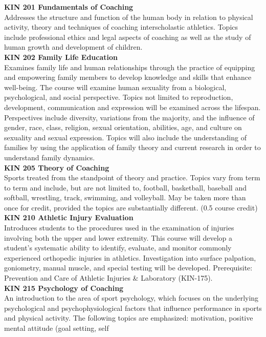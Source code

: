 \documentclass[
  letterpaper,
]{scrbook}
\begin{document}
\textbf{KIN 201 Fundamentals of Coaching}\\
Addresses the structure and function of the human body in relation to
physical activity, theory and techniques of coaching interscholastic
athletics. Topics include professional ethics and legal aspects of
coaching as well as the study of human growth and development of
children.\\
\textbf{KIN 202 Family Life Education}\\
Examines family life and human relationships through the practice of
equipping and empowering family members to develop knowledge and skills
that enhance well-being. The course will examine human sexuality from a
biological, psychological, and social perspective. Topics not limited to
reproduction, development, communication and expression will be examined
across the lifespan. Perspectives include diversity, variations from the
majority, and the influence of gender, race, class, religion, sexual
orientation, abilities, age, and culture on sexuality and sexual
expression. Topics will also include the understanding of families by
using the application of family theory and current research in order to
understand family dynamics.\\
\textbf{KIN 205 Theory of Coaching}\\
Sports treated from the standpoint of theory and practice. Topics vary
from term to term and include, but are not limited to, football,
basketball, baseball and softball, wrestling, track, swimming, and
volleyball. May be taken more than once for credit, provided the topics
are substantially different. (0.5 course credit)\\
\textbf{KIN 210 Athletic Injury Evaluation}\\
Introduces students to the procedures used in the examination of
injuries involving both the upper and lower extremity. This course will
develop a student's systematic ability to identify, evaluate, and
monitor commonly experienced orthopedic injuries in athletics.
Investigation into surface palpation, goniometry, manual muscle, and
special testing will be developed. Prerequisite: Prevention and Care of
Athletic Injuries \& Laboratory (KIN-175).\\
\textbf{KIN 215 Psychology of Coaching}\\
An introduction to the area of sport psychology, which focuses on the
underlying psychological and psychophysiological factors that influence
performance in sports and physical activity. The following topics are
emphasized: motivation, positive mental attitude (goal setting, self
\end{document}
